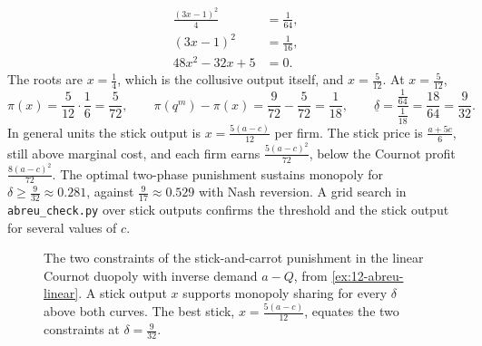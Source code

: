 \begin{example}
\begin{align*}
\frac{(3x - 1)^2}{4} &= \frac{1}{64} , \\
(3x - 1)^2 &= \frac{1}{16} , \\
48x^2 - 32x + 5 &= 0 .
\end{align*}
The roots are $x = \frac{1}{4}$, which is the collusive output itself, and $x = \frac{5}{12}$. At $x = \frac{5}{12}$,
\begin{equation*}
\pi(x) = \frac{5}{12}\cdot\frac{1}{6} = \frac{5}{72}, \qquad
\pi(q^m) - \pi(x) = \frac{9}{72} - \frac{5}{72} = \frac{1}{18}, \qquad
\underline\delta = \frac{\frac{1}{64}}{\frac{1}{18}} = \frac{18}{64} = \frac{9}{32} .
\end{equation*}
In general units the stick output is $x = \frac{5(a - c)}{12}$ per firm. The stick price is
$\frac{a + 5c}{6}$, still above marginal cost, and each firm earns $\frac{5(a - c)^2}{72}$, below the Cournot profit
$\frac{8(a - c)^2}{72}$. The optimal two-phase punishment sustains monopoly for $\delta \ge \frac{9}{32} \approx
0.281$, against $\frac{9}{17} \approx 0.529$ with Nash reversion. A grid search in \texttt{abreu\_check.py} over
stick outputs confirms the threshold and the stick output for several values of $c$.
\end{example}

\begin{figure}[htbp]
\centering
{}
\caption{The two constraints of the stick-and-carrot punishment in the linear Cournot duopoly with inverse demand
$a - Q$, from \cref{ex:12-abreu-linear}. A stick output $x$ supports monopoly sharing for every $\delta$ above both
curves. The best stick, $x = \frac{5(a - c)}{12}$, equates the two constraints at $\delta = \frac{9}{32}$.}
\label{fig:12-abreu}
\end{figure}

